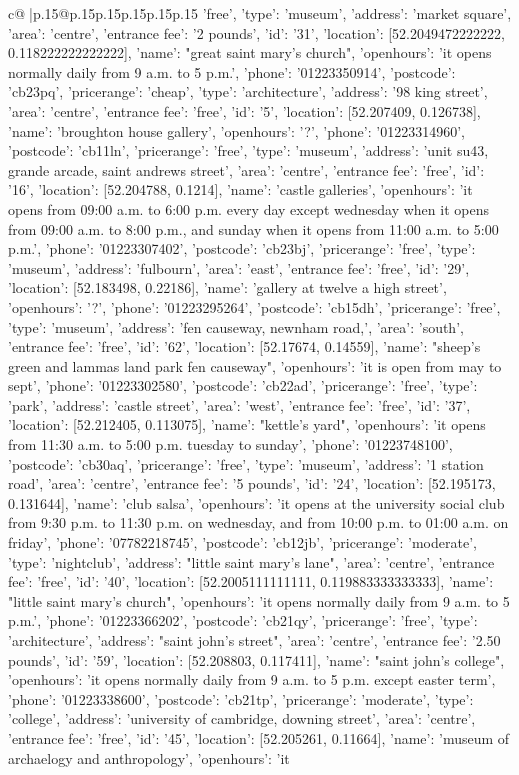 \documentclass{article}
\begin{document}
{\begin{supertabular}{c@{$\;$}|p{.15\linewidth}@{}p{.15\linewidth}p{.15\linewidth}p{.15\linewidth}p{.15\linewidth}p{.15\linewidth}}
{{{'free', 'type': 'museum'}, {'address': 'market square', 'area': 'centre', 'entrance fee': '2 pounds', 'id': '31', 'location': [52.2049472222222, 0.118222222222222], 'name': "great saint mary's church", 'openhours': 'it opens normally daily from 9 a.m. to 5 p.m.', 'phone': '01223350914', 'postcode': 'cb23pq', 'pricerange': 'cheap', 'type': 'architecture'}, {'address': '98 king street', 'area': 'centre', 'entrance fee': 'free', 'id': '5', 'location': [52.207409, 0.126738], 'name': 'broughton house gallery', 'openhours': '?', 'phone': '01223314960', 'postcode': 'cb11ln', 'pricerange': 'free', 'type': 'museum'}, {'address': 'unit su43, grande arcade, saint andrews street', 'area': 'centre', 'entrance fee': 'free', 'id': '16', 'location': [52.204788, 0.1214], 'name': 'castle galleries', 'openhours': 'it opens from 09:00 a.m. to 6:00 p.m. every day except wednesday when it opens from 09:00 a.m. to 8:00 p.m., and sunday when it opens from 11:00 a.m. to 5:00 p.m.', 'phone': '01223307402', 'postcode': 'cb23bj', 'pricerange': 'free', 'type': 'museum'}, {'address': 'fulbourn', 'area': 'east', 'entrance fee': 'free', 'id': '29', 'location': [52.183498, 0.22186], 'name': 'gallery at twelve a high street', 'openhours': '?', 'phone': '01223295264', 'postcode': 'cb15dh', 'pricerange': 'free', 'type': 'museum'}, {'address': 'fen causeway, newnham road,', 'area': 'south', 'entrance fee': 'free', 'id': '62', 'location': [52.17674, 0.14559], 'name': "sheep's green and lammas land park fen causeway", 'openhours': 'it is open from may to sept', 'phone': '01223302580', 'postcode': 'cb22ad', 'pricerange': 'free', 'type': 'park'}, {'address': 'castle street', 'area': 'west', 'entrance fee': 'free', 'id': '37', 'location': [52.212405, 0.113075], 'name': "kettle's yard", 'openhours': 'it opens from 11:30 a.m. to 5:00 p.m. tuesday to sunday', 'phone': '01223748100', 'postcode': 'cb30aq', 'pricerange': 'free', 'type': 'museum'}, {'address': '1 station road', 'area': 'centre', 'entrance fee': '5 pounds', 'id': '24', 'location': [52.195173, 0.131644], 'name': 'club salsa', 'openhours': 'it opens at the university social club from 9:30 p.m. to 11:30 p.m. on wednesday, and from 10:00 p.m. to 01:00 a.m. on friday', 'phone': '07782218745', 'postcode': 'cb12jb', 'pricerange': 'moderate', 'type': 'nightclub'}, {'address': "little saint mary's lane", 'area': 'centre', 'entrance fee': 'free', 'id': '40', 'location': [52.2005111111111, 0.119883333333333], 'name': "little saint mary's church", 'openhours': 'it opens normally daily from 9 a.m. to 5 p.m.', 'phone': '01223366202', 'postcode': 'cb21qy', 'pricerange': 'free', 'type': 'architecture'}, {'address': "saint john's street", 'area': 'centre', 'entrance fee': '2.50 pounds', 'id': '59', 'location': [52.208803, 0.117411], 'name': "saint john's college", 'openhours': 'it opens normally daily from 9 a.m. to 5 p.m. except easter term', 'phone': '01223338600', 'postcode': 'cb21tp', 'pricerange': 'moderate', 'type': 'college'}, {'address': 'university of cambridge, downing street', 'area': 'centre', 'entrance fee': 'free', 'id': '45', 'location': [52.205261, 0.11664], 'name': 'museum of archaelogy and anthropology', 'openhours': 'it }}}
\end{supertabular}}
\end{document}
